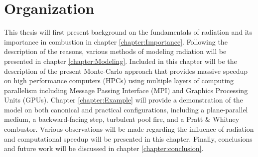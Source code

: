 \section{Organization}
This thesis will first present background on the fundamentals of radiation and its importance in combustion in chapter \ref{chapter:Importance}. 
Following the description of the reasons, various methods of modeling radiation will be presented in chapter \ref{chapter:Modeling}.
Included in this chapter will be the description of the present Monte-Carlo approach that provides massive speedup on high performance computers (HPCs) using multiple layers of computing parallelism including Message Passing Interface (MPI) and Graphics Processing Units (GPUs).
Chapter \ref{chapter:Example} will provide a demonstration of the model on both canonical and practical configurations, including a plane-parallel medium, a backward-facing step, turbulent pool fire, and a Pratt \& Whitney combustor. Various observations will be made regarding the influence of radiation and computational speedup will be presented in this chapter.
Finally, conclusions and future work will be discussed in chapter \ref{chapter:conclusion}.
